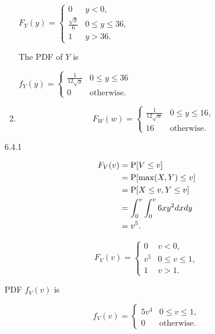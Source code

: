 \documentclass{article}
\begin{document}
\begin{enumerate}
\begin{enumerate}[label=(\alph*)]
        $F_Y(y) =
        \begin{cases}
            0 & y < 0, \\
            \frac{\sqrt y}{6} & 0 \le y \le 36, \\
            1 & y > 36. 
        \end{cases}
        $

        The PDF of $Y$ is

        $f_Y(y) =
        \begin{cases}
            \frac{1}{12\sqrt y} & 0 \le y \le 36 \\
            0 & \text{otherwise}.
        \end{cases}
        $
        \item 

        $$F_W(w) = \begin{cases}
            \frac{1}{12 \sqrt w} & 0 \le y \le 16, \\
            16 & \text{otherwise}.
        \end{cases}
        $$
    \end{enumerate}

    \item [6.4.1]

    \begin{align*}
        F_V(v) 
            & = \text P[V \le v] \\
            & = \text P[\max(X, Y) \le v] \\
            & = \text P[X \le v, Y \le v] \\
            & = \int_0^v \int_0^v 6xy^2 dx dy \\
            & = v^5.
    \end{align*}

    $$F_V(v) = \begin{cases}
        0 & v < 0, \\
        v^5 & 0 \le v \le 1, \\
        1 & v > 1.
    \end{cases}
    $$

    PDF $f_V(v)$ is

    $$f_V(v) = \begin{cases}
        5v^4 & 0 \le v \le 1, \\
        0    & \text{otherwise}.
    \end{cases}
    $$

\end{enumerate}
\end{document}
